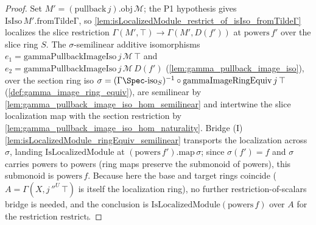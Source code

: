 \begin{proof}
  Set \(M' = (\mathrm{pullback}\,j).\mathrm{obj}\,\mathcal{M}\); the P1 hypothesis gives
  \(\mathrm{IsIso}\,M'.\mathrm{fromTildeΓ}\), so \cref{lem:isLocalizedModule_restrict_of_isIso_fromTildeΓ}
  localizes the slice restriction \(\Gamma(M', \top) \to \Gamma(M', D(f'))\) at \(\mathrm{powers}\,f'\)
  over the slice ring \(S\). The \(\sigma\)-semilinear additive isomorphisms
  \(e_1 = \mathrm{gammaPullbackImageIso}\,j\,\mathcal{M}\,\top\) and
  \(e_2 = \mathrm{gammaPullbackImageIso}\,j\,\mathcal{M}\,D(f')\) (\cref{lem:gamma_pullback_image_iso}),
  over the section ring iso
  \(\sigma = (\Gamma\Spec\text{-iso}_S)^{-1} \circ \mathrm{gammaImageRingEquiv}\,j\,\top\)
  (\cref{def:gamma_image_ring_equiv}), are semilinear by
  \cref{lem:gamma_pullback_image_iso_hom_semilinear} and intertwine the slice localization map with the
  section restriction by \cref{lem:gamma_pullback_image_iso_hom_naturality}. Bridge (I)
  \cref{lem:isLocalizedModule_ringEquiv_semilinear} transports the localization across \(\sigma\),
  landing \(\mathrm{IsLocalizedModule}\) at \((\mathrm{powers}\,f').\mathrm{map}\,\sigma\); since
  \(\sigma(f') = f\) and \(\sigma\) carries powers to powers (ring maps preserve the submonoid of powers),
  this submonoid is \(\mathrm{powers}\,f\). Because here the base and
  target rings coincide (\(A = \Gamma(X, j\,''^{U}\,\top)\) is itself the localization ring), no further
  restriction-of-scalars bridge is needed, and the conclusion is
  \(\mathrm{IsLocalizedModule}(\mathrm{powers}\,f)\) over \(A\) for the restriction \(\mathrm{restrictₗ}\).
\end{proof}


